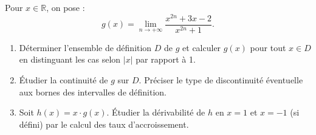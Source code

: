 \documentclass[11pt]{article}
\begin{document}
\begin{exercice}
Pour $x \in \mathbb{R}$, on pose :
$$ g(x) = \lim_{n \to +\infty} \frac{x^{2n} + 3x - 2}{x^{2n} + 1}. $$
\begin{enumerate}
    \item Déterminer l'ensemble de définition $D$ de $g$ et calculer $g(x)$ pour tout $x \in D$ en distinguant les cas selon $|x|$ par rapport à 1.
    \item Étudier la continuité de $g$ sur $D$. Préciser le type de discontinuité éventuelle aux bornes des intervalles de définition.
    \item Soit $h(x) = x \cdot g(x)$. Étudier la dérivabilité de $h$ en $x=1$ et $x=-1$ (si défini) par le calcul des taux d'accroissement.
\end{enumerate}
\end{exercice}
\end{document}
